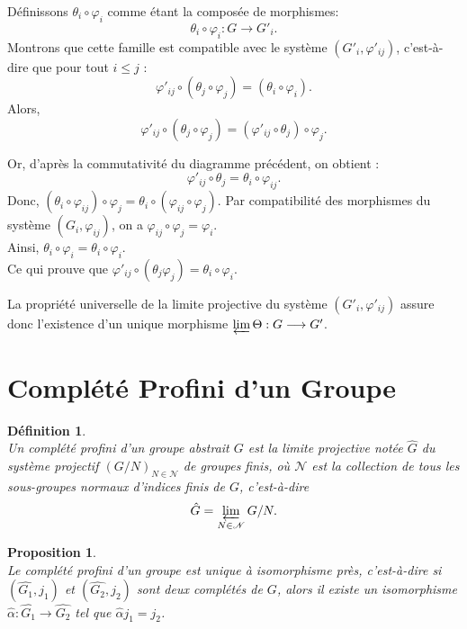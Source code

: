 \documentclass[a4paper, 14pt]{report}
\newtheorem{definition}{Définition}[section]
\newtheorem{proposition}{Proposition}[section]
\begin{document}
\begin{onehalfspace}
{Définissons $\theta_i \circ \varphi_i$ comme étant la composée de morphismes:
\[
\theta_i \circ \varphi_i : G \to G'_i.
\]
Montrons que cette famille est compatible avec le système $(G'_i, \varphi'_{ij})$, c'est-à-dire que pour tout $i \leq j$ :
\[
\varphi'_{ij} \circ (\theta_j \circ \varphi_j) = (\theta_i \circ \varphi_i).
\]	
Alors, 
\[
\varphi'_{ij} \circ (\theta_j \circ \varphi_j) = (\varphi'_{ij} \circ \theta_j) \circ \varphi_j.
\]

Or, d’après la commutativité du diagramme précédent, on obtient :
\[
\varphi'_{ij} \circ \theta_j = \theta_i \circ \varphi_{ij}.
\]
Donc, \((\theta_i \circ \varphi_{ij}) \circ \varphi_j = \theta_i \circ (\varphi_{ij} \circ \varphi_j).\)
Par compatibilité des morphismes du système $(G_i, \varphi_{ij})$, on a
\(\varphi_{ij} \circ \varphi_j = \varphi_i.\) \\
Ainsi,
\(
\theta_i \circ \varphi_i = \theta_i \circ \varphi_i.
\) \\
Ce qui prouve que 
\(
\varphi'_{ij} \circ (\theta_j \varphi_j) = \theta_i \circ \varphi_i.
\)

La propriété universelle de la limite projective du système $(G'_i, \varphi'_{ij})$ assure donc l'existence d'un unique morphisme $\varprojlim \Theta : G \longrightarrow G'$.


\section{Complété Profini d'un Groupe }

\begin{definition} \cite{herfort2012profinite}\\
Un complété profini d’un groupe abstrait \( G \) est la limite projective notée $\widehat{G}$ du système projectif \( (G/N)_{N \in \mathscr{N}} \) de groupes finis, où \( \mathscr{N} \) est la collection de tous les sous-groupes normaux d’indices finis de \( G \), c’est-à-dire
	\[
	\hat{G} = \varprojlim_{N \in \mathscr{N}} G/N.
	\]
\end{definition}

\begin{proposition} \cite{herfort2012profinite}\\
Le complété profini d’un groupe est unique à isomorphisme près, c’est-à-dire si $(\widehat{G_1}, j_1)$ et $(\widehat{G_2}, j_2)$ sont deux complétés de $G$, alors il existe un isomorphisme $\widehat{\alpha} : \widehat{G_1} \to \widehat{G_2}$ tel que $\widehat{\alpha} j_1 = j_2$.
\end{proposition}

}
\end{onehalfspace}
\end{document}
